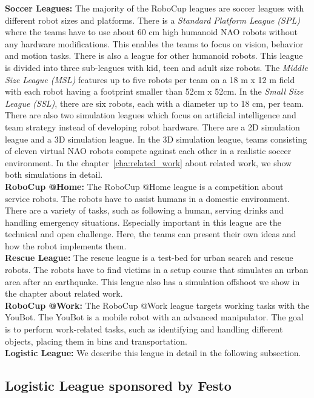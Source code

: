 \textbf{Soccer Leagues:} The majority of the RoboCup leagues are soccer leagues with different robot sizes and platforms. There is a \textit{Standard Platform League (SPL)} where the teams have to use about 60 cm high humanoid NAO robots without any hardware modifications. This enables the teams to focus on vision, behavior and motion tasks. There is also a league for other humanoid robots. This league is divided into three sub-leagues with kid, teen and adult size robots. The \textit{Middle Size League (MSL)} features up to five robots per team on a 18 m x 12 m field with each robot having a footprint smaller than 52cm x 52cm. In the \textit{Small Size League (SSL)}, there are six robots, each with a diameter up to 18 cm, per team. There are also two simulation leagues which focus on artificial intelligence and team strategy instead of developing robot hardware. There are a 2D simulation league and a 3D simulation league. In the 3D simulation league, teams consisting of eleven virtual NAO robots compete against each other in a realistic soccer environment. In the chapter~\ref{cha:related_work} about related work, we show both simulations in detail.\\
\textbf{RoboCup @Home:} The RoboCup @Home league is a competition about service robots. The robots have to assist humans in a domestic environment. There are a variety of tasks, such as following a human, serving drinks and handling emergency situations. Especially important in this league are the technical and open challenge. Here, the teams can present their own ideas and how the robot implements them.\\
\textbf{Rescue League:} The rescue league is a test-bed for urban search and rescue robots. The robots have to find victims in a setup course that simulates an urban area after an earthquake. This league also has a simulation offshoot we show in the chapter about related work.\\
\textbf{RoboCup @Work:} The RoboCup @Work league targets working tasks with the YouBot. The YouBot is a mobile robot with an advanced manipulator. The goal is to perform work-related tasks, such as identifying and handling different objects, placing them in bins and transportation.\\
\textbf{Logistic League:} We describe this league in detail in the following subsection.\\

\subsection{Logistic League sponsored by Festo}


